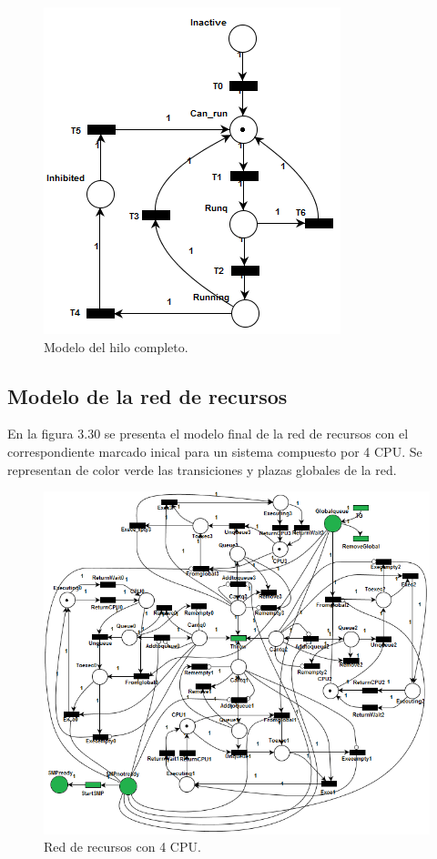 \documentclass[a4paper]{book}
\begin{document}
\begin{figure} [H]
	\begin{center}
	    \includegraphics[scale=0.95]{./imagenes/hilo.png}
		\caption{Modelo del hilo completo.}
	\end{center}
\end{figure}

\subsection{Modelo de la red de recursos}

En la figura 3.30 se presenta el modelo final de la red de recursos con el correspondiente marcado inical para un sistema compuesto por 4 CPU. Se representan de color verde las transiciones y plazas globales de la red.

\begin{figure}
	\begin{center}
        \includegraphics[scale=0.75]{./imagenes/red4CPU.png}
		\caption{Red de recursos con 4 CPU.}
	\end{center}
\end{figure}
\end{document}
